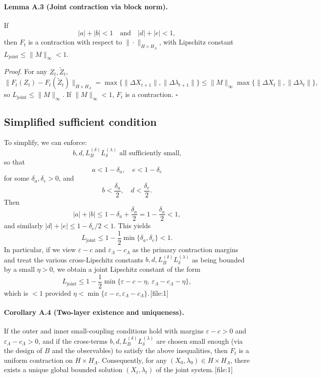 \documentclass[11pt]{article}
\begin{document}
\paragraph{Lemma A.3 (Joint contraction via block norm).}
If
\[
|a|+|b|<1
\quad\text{and}\quad
|d|+|e|<1,
\]
then $F_t$ is a contraction with respect to $\|\cdot\|_{H\times H_\Lambda}$, with Lipschitz constant $L_{\mathrm{joint}}\le \|M\|_\infty<1$.

\medskip
\noindent\emph{Proof.}
For any $Z_t,\tilde{Z}_t$,
\[
\|F_t(Z_t)-F_t(\tilde{Z}_t)\|_{H\times H_\Lambda}
= \max\{\|\Delta X_{t+1}\|,\|\Delta\lambda_{t+1}\|\}
\le \|M\|_\infty \max\{\|\Delta X_t\|,\|\Delta\lambda_t\|\},
\]
so $L_{\mathrm{joint}}\le\|M\|_\infty$. If $\|M\|_\infty<1$, $F_t$ is a contraction. \hfill$\square$

\subsection{Simplified sufficient condition}

To simplify, we can enforce:
\[
b,d,L_B^{(\delta)} L_\delta^{(\lambda)} \text{ all sufficiently small,}
\]
so that
\[
a < 1-\delta_a, \quad e<1-\delta_e
\]
for some $\delta_a,\delta_e>0$, and
\[
b < \frac{\delta_a}{2},\quad d<\frac{\delta_e}{2}.
\]
Then
\[
|a|+|b|\le 1-\delta_a + \frac{\delta_a}{2} = 1-\frac{\delta_a}{2}<1,
\]
and similarly $|d|+|e|\le 1-\delta_e/2<1$. This yields
\[
L_{\mathrm{joint}}\le 1 - \frac{1}{2}\min\{\delta_a,\delta_e\} < 1.
\]
In particular, if we view $\varepsilon-c$ and $\varepsilon_\Lambda-c_\Lambda$ as the primary contraction margins and treat the various cross-Lipschitz constants $b,d,L_B^{(\delta)}L_\delta^{(\lambda)}$ as being bounded by a small $\eta>0$, we obtain a joint Lipschitz constant of the form
\[
L_{\mathrm{joint}}
\le 1 - \frac{1}{2}\min\{\varepsilon-c-\eta,\ \varepsilon_\Lambda-c_\Lambda-\eta\},
\]
which is $<1$ provided $\eta<\min\{\varepsilon-c,\varepsilon_\Lambda-c_\Lambda\}$.\,[file:1]

\paragraph{Corollary A.4 (Two-layer existence and uniqueness).}
If the outer and inner small-coupling conditions hold with margins $\varepsilon-c>0$ and $\varepsilon_\Lambda-c_\Lambda>0$, and if the cross-terms $b,d,L_B^{(\delta)}L_\delta^{(\lambda)}$ are chosen small enough (via the design of $B$ and the observables) to satisfy the above inequalities, then $F_t$ is a uniform contraction on $H\times H_\Lambda$. Consequently, for any $(X_0,\lambda_0)\in H\times H_\Lambda$, there exists a unique global bounded solution $(X_t,\lambda_t)$ of the joint system.\,[file:1]
\end{document}
